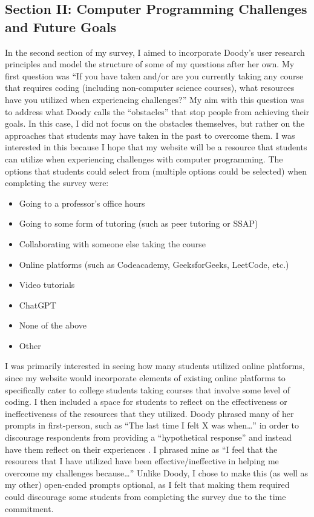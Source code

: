 \documentclass[10pt,twocolumn]{article}
\begin{document}
\subsection{Section II: Computer Programming Challenges and Future Goals}
In the second section of my survey, I aimed to incorporate Doody’s user research principles and model the structure of some of my questions after her own. My first question was “If you have taken and/or are you currently taking any course that requires coding (including non-computer science courses), what resources have you utilized when experiencing challenges?” My aim with this question was to address what Doody calls the “obstacles” that stop people from achieving their goals. In this case, I did not focus on the obstacles themselves, but rather on the approaches that students may have taken in the past to overcome them. I was interested in this because I hope that my website will be a resource that students can utilize when experiencing challenges with computer programming. The options that students could select from (multiple options could be selected) when completing the survey were:
 \begin{itemize}
    \item{Going to a professor's office hours}
    \item{Going to some form of tutoring (such as peer tutoring or SSAP)}
    \item{Collaborating with someone else taking the course}
    \item{Online platforms (such as Codeacademy, GeeksforGeeks, LeetCode, etc.)}
    \item{Video tutorials}
    \item{ChatGPT}
    \item{None of the above}
    \item{Other}
\end{itemize}
I was primarily interested in seeing how many students utilized online platforms, since my website would incorporate elements of existing online platforms to specifically cater to college students taking courses that involve some level of coding. I then included a space for students to reflect on the effectiveness or ineffectiveness of the resources that they utilized. Doody phrased many of her prompts in first-person, such as “The last time I felt X was when…” in order to discourage respondents from providing a “hypothetical response” and instead have them reflect on their experiences \cite{Tutorial}. I phrased mine as “I feel that the resources that I have utilized have been effective/ineffective in helping me overcome my challenges because…” Unlike Doody, I chose to make this (as well as my other) open-ended prompts optional, as I felt that making them required could discourage some students from completing the survey due to the time commitment. 
\end{document}
